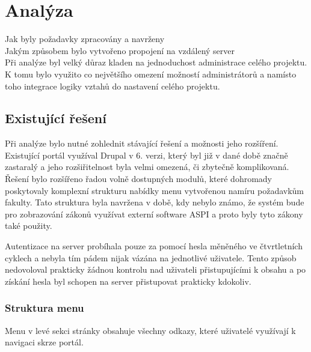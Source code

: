 \chapter{Analýza}
\label{chap:analyza}
Jak byly požadavky zpracovány a navrženy \\
Jakým způsobem bylo vytvořeno propojení na vzdálený server \\
Při analýze byl velký důraz kladen na jednoduchost administrace celého projektu. K tomu bylo využito co největšího omezení možností administrátorů a namísto toho integrace logiky vztahů do nastavení celého projektu.

\section{Existující řešení}
Při analýze bylo nutné zohlednit stávající řešení a možnosti jeho rozšíření. Existující portál využíval Drupal v 6. verzi, který byl již v dané době značně zastaralý a jeho rozšiřitelnost byla velmi omezená, či zbytečně komplikovaná. Řešení bylo rozšířeno řadou volně dostupných modulů, které dohromady poskytovaly komplexní strukturu nabídky menu vytvořenou namíru požadavkům fakulty. Tato struktura byla navržena v době, kdy nebylo známo, že systém bude pro zobrazování zákonů využívat externí software ASPI a proto byly tyto zákony také použity. 

Autentizace na server probíhala pouze za pomocí hesla měněného ve čtvrtletních cyklech a nebyla tím pádem nijak vázána na jednotlivé uživatele. Tento způsob nedovoloval prakticky žádnou kontrolu nad uživateli přistupujícími k obsahu a po získání hesla byl schopen na server přistupovat prakticky kdokoliv. 

\subsection{Struktura menu}

Menu v levé sekci stránky obsahuje všechny odkazy, které uživatelé využívají k navigaci skrze portál. 

